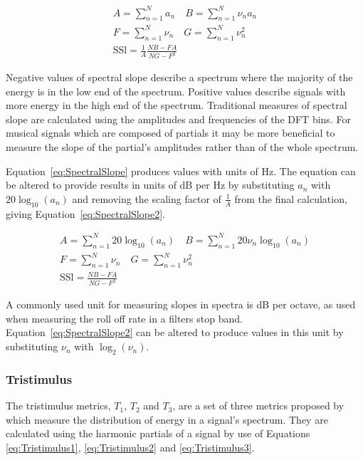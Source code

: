 			\begin{gather}
				A = \sum_{n = 1}^{N} a_{n}
				\quad 
				B = \sum_{n = 1}^{N} \nu_{n}a_{n} \nonumber \\
				F = \sum_{n = 1}^{N} \nu_{n} \quad G = \sum_{n = 1}^{N} \nu_{n}^{2} \nonumber \\
				\mathrm{SSl} = \frac{1}{A} \frac{NB - FA}{NG - F^{2}}
				\label{eq:SpectralSlope}
			\end{gather}

			Negative values of spectral slope describe a spectrum where the majority of the energy is in the
			low end of the spectrum. Positive values describe signals with more energy in the high end of the
			spectrum. Traditional measures of spectral slope are calculated using the amplitudes and
			frequencies of the DFT bins. For musical signals which are composed of partials it may be more
			beneficial to measure the slope of the partial's amplitudes rather than of the whole spectrum. 
			
			Equation~\ref{eq:SpectralSlope} produces values with units of Hz. The equation can be
			altered to provide results in units of dB per Hz by substituting $a_{n}$ with $20\log_{10}(a_{n})$
			and removing the scaling factor of $\frac{1}{A}$ from the final calculation, giving
			Equation~\ref{eq:SpectralSlope2}.
			
			\begin{gather}
				A = \sum_{n = 1}^{N} 20\log_{10}(a_{n})
				\quad 
				B = \sum_{n = 1}^{N} 20\nu_{n}\log_{10}(a_{n}) \nonumber \\
				F = \sum_{n = 1}^{N} \nu_{n} \quad G = \sum_{n = 1}^{N} \nu_{n}^{2} \nonumber \\
				\mathrm{SSl} = \frac{NB - FA}{NG - F^{2}}
				\label{eq:SpectralSlope2}
			\end{gather}
			
			A commonly used unit for measuring slopes in spectra is dB per octave, as used when measuring the
			roll off rate in a filters stop band. Equation~\ref{eq:SpectralSlope2} can be altered to produce
			values in this unit by substituting $\nu_{n}$ with $\log_{2}(\nu_{n})$.

		\subsubsection*{Tristimulus}
			The tristimulus metrics, $T_{1}$, $T_{2}$ and $T_{3}$, are a set of three metrics proposed by
			\citet{pollard1982a} which measure the distribution of energy in a signal's spectrum. They are
			calculated using the harmonic partials of a signal by use of Equations \ref{eq:Tristimulus1},
			\ref{eq:Tristimulus2} and \ref{eq:Tristimulus3}.
			
